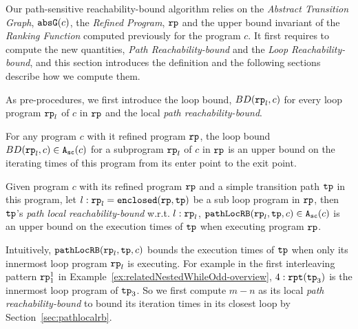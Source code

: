 Our path-sensitive reachability-bound algorithm relies on the \emph{Abstract Transition Graph}, $\mathtt{abs}{\mathtt{G}}(c)$, the \emph{Refined Program}, $\mathtt{rp}$ and the upper bound invariant of the \emph{Ranking Function} computed previously for the program $c$.
It first requires to compute the new quantities, \emph{Path Reachability-bound} and the \emph{Loop Reachability-bound}, and this section introduces the definition and the following sections describe how we compute them.

As pre-procedures, we first introduce the loop bound, $BD(\mathtt{rp}_l, c)$ for every loop program $\mathtt{rp}_l$ of $c$ in $\mathtt{rp}$ and the local \emph{path reachability-bound}.
\begin{defn}
  For any program $c$ with it refined program $\mathtt{rp}$,
  the loop bound $BD(\mathtt{rp}_l, c) \in {\ensuremath{\mathtt{A_{sc}}}}(c)$ for a subprogram $\mathtt{rp}_l$ of $c$ in $\mathtt{rp}$ is an upper bound on the iterating times of this program from its enter point to the exit point.
\end{defn}
% 
\begin{defn}
  Given program $c$ with its refined program $\mathtt{rp}$ and a simple transition path $\mathtt{tp}$ in this program, 
  let $l: \mathtt{rp}_l = \mathtt{enclosed}(\mathtt{rp}, \mathtt{tp})$ be a sub loop program in $\mathtt{rp}$,
  then $\mathtt{tp}$'s \emph{path local reachability-bound} w.r.t. $l: \mathtt{rp}_l$,  $\mathtt{pathLocRB}(\mathtt{rp}_l, \mathtt{tp}, c) \in {\ensuremath{\mathtt{A_{sc}}}}(c)$
  is an upper bound on the execution times of $\mathtt{tp}$ when executing program $\mathtt{rp}$.
\end{defn}
Intuitively,
$\mathtt{pathLocRB}(\mathtt{rp}_l, \mathtt{tp}, c)$ bounds the execution times of $\mathtt{tp}$ when only its innermost loop program $\mathtt{rp}_l$ is executing.
For example in the first interleaving pattern $\mathtt{rp}_1^1$ in Example~\ref{ex:relatedNestedWhileOdd-overview}, 
$4:\mathtt{rpt}(\mathtt{tp}_3)$ is the innermost loop program of $\mathtt{tp}_3$. So we first compute $m - n$ as its local \emph{path reachability-bound} to bound its iteration times in its closest loop by Section~\ref{sec:pathlocalrb}.


